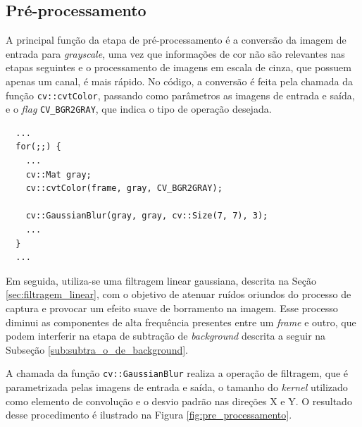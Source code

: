 
\subsection{Pré-processamento} %
\label{sub:pr_processamento}

A principal função da etapa de pré-processamento é a conversão da imagem de entrada para \textit{grayscale}, uma vez que informações de cor não são relevantes nas etapas seguintes e o processamento de imagens em escala de cinza, que possuem apenas um canal, é mais rápido. No código, a conversão é feita pela chamada da função \verb!cv::cvtColor!, passando como parâmetros as imagens de entrada e saída, e o \textit{flag} \verb!CV_BGR2GRAY!, que indica o tipo de operação desejada.

\begin{lstlisting}
  ...
  for(;;) {
    ...
    cv::Mat gray;
    cv::cvtColor(frame, gray, CV_BGR2GRAY);

    cv::GaussianBlur(gray, gray, cv::Size(7, 7), 3);
    ...
  }
  ...  
\end{lstlisting}

Em seguida, utiliza-se uma filtragem linear gaussiana, descrita na Seção \ref{sec:filtragem_linear}, com o objetivo de atenuar ruídos oriundos do processo de captura e provocar um efeito suave de borramento na imagem. Esse processo diminui as componentes de alta frequência presentes entre um \textit{frame} e outro, que podem interferir na etapa de subtração de \textit{background} descrita a seguir na Subseção \ref{sub:subtra_o_de_background}. 

A chamada da função \verb!cv::GaussianBlur! realiza a operação de filtragem, que é parametrizada pelas imagens de entrada e saída, o tamanho do \textit{kernel} utilizado como elemento de convolução e o desvio padrão nas direções X e Y. O resultado desse procedimento é ilustrado na Figura \ref{fig:pre_processamento}.

